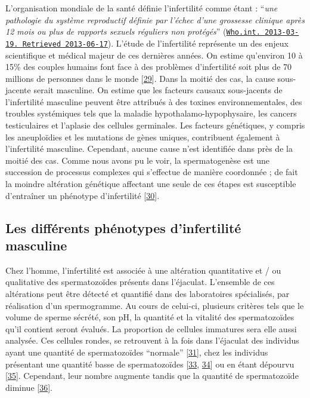 \documentclass[12pt,twoside]{reedthesis}
\theoremstyle{definition}
\theoremstyle{definition}
\theoremstyle{remark}
\begin{document}
  L'organisation mondiale de la santé définie l'infertilité comme étant :
  ``\emph{une pathologie du système reproductif définie par l'échec d'une
  grossesse clinique après 12 mois ou plus de rapports sexuels réguliers
  non protégés}''
  (\href{http://www.who.int/reproductivehealth/topics/infertility/definitions/en/}{\texttt{Who.int.\ 2013-03-19.\ Retrieved\ 2013-06-17}}).
  L'étude de l'infertilité représente un des enjeux scientifique et
  médical majeur de ces dernières années. On estime qu'environ 10 à 15\%
  des couples humains font face à des problèmes d'infertilité soit plus de
  70 millions de personnes dans le monde
  {[}\protect\hyperlink{ref-Boivin2007a}{29}{]}. Dans la moitié des cas,
  la cause sous-jacente serait masculine. On estime que les facteurs
  causaux sous-jacents de l'infertilité masculine peuvent être attribués à
  des toxines environnementales, des troubles systémiques tels que la
  maladie hypothalamo-hypophysaire, les cancers testiculaires et l'aplasie
  des cellules germinales. Les facteurs génétiques, y compris les
  aneuploïdies et les mutations de gènes uniques, contribuent également à
  l'infertilité masculine. Cependant, aucune cause n'est identifiée dans
  près de la moitié des cas. Comme nous avons pu le voir, la
  spermatogenèse est une succession de processus complexes qui s'effectue
  de manière coordonnée ; de fait la moindre altération génétique
  affectant une seule de ces étapes est susceptible d'entraîner un
  phénotype d'infertilité
  {[}\protect\hyperlink{ref-Grudzinskas1995}{30}{]}.
  
  \subsection{Les différents phénotypes d'infertilité
  masculine}\label{les-differents-phenotypes-dinfertilite-masculine}
  
  Chez l'homme, l'infertilité est associée à une altération quantitative
  et / ou qualitative des spermatozoïdes présents dans l'éjaculat.
  L'ensemble de ces altérations peut être détecté et quantifié dans des
  laboratoires spécialisés, par réalisation d'un spermogramme. Au cours de
  celui-ci, plusieurs critères tels que le volume de sperme sécrété, son
  pH, la quantité et la vitalité des spermatozoïdes qu'il contient seront
  évalués. La proportion de cellules immatures sera elle aussi analysée.
  Ces cellules rondes, se retrouvent à la fois dans l'éjaculat des
  individus ayant une quantité de spermatozoïdes ``normale''
  {[}\protect\hyperlink{ref-Michael1937}{31}{]}, chez les individus
  présentant une quantité basse de spermatozoïdes
  {[}\protect\hyperlink{ref-MacLeod1970}{33},
  \protect\hyperlink{ref-Tomlinson1993}{34}{]} ou en étant dépourvu
  {[}\protect\hyperlink{ref-Kurilo}{35}{]}. Cependant, leur nombre
  augmente tandis que la quantité de spermatozoïde diminue
  {[}\protect\hyperlink{ref-SPERLING1971}{36}{]}.
  
\end{document}
